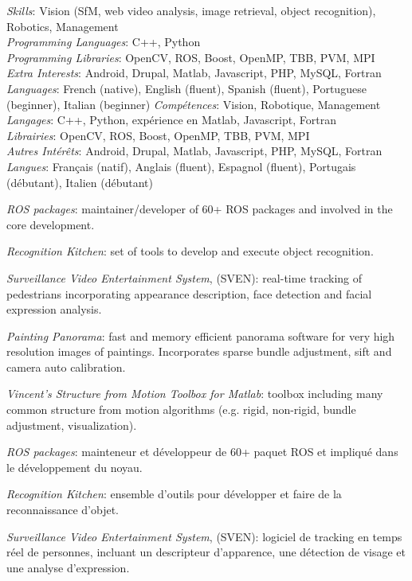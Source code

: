 \documentclass{article}
\begin{document}
\begin{llist}
{
{\em Skills}: Vision (SfM, web video analysis, image retrieval, object recognition), Robotics, Management \\
{\em Programming Languages}: C++, Python\\
{\em Programming Libraries}: OpenCV, ROS, Boost, OpenMP, TBB, PVM, MPI \\
{\em Extra Interests}: Android, Drupal, Matlab, Javascript, PHP, MySQL, Fortran \\
{\em Languages}: French (native), English (fluent), Spanish (fluent), Portuguese (beginner), Italian (beginner)
}
{
{\em Comp\'{e}tences}: Vision, Robotique, Management\\
{\em Langages}: C++, Python, exp\'{e}rience en Matlab, Javascript, Fortran \\
{\em Librairies}: OpenCV, ROS, Boost, OpenMP, TBB, PVM, MPI \\
{\em Autres Int\'{e}r\^{e}ts}: Android, Drupal, Matlab, Javascript, PHP, MySQL, Fortran \\
{\em Langues}: Fran\c{c}ais (natif), Anglais (fluent), Espagnol (fluent), Portugais (d\'{e}butant), Italien 
(d\'{e}butant)
}

{
{\em ROS packages}: maintainer/developer of 60+ ROS packages and involved in the core development.

{\em Recognition Kitchen}: set of tools to develop and execute object recognition.

{\em Surveillance Video Entertainment System}, (SVEN): real-time tracking of pedestrians incorporating appearance 
description, face detection and facial expression analysis.

{\em Painting Panorama}: fast and memory efficient panorama software for very high resolution images of paintings.  Incorporates sparse bundle adjustment, sift and camera auto calibration.

{\em Vincent's Structure from Motion Toolbox for Matlab}: toolbox including many common structure from motion algorithms 
(e.g. rigid, non-rigid, bundle adjustment, visualization).
}
{
{\em ROS packages}: mainteneur et d\'{e}veloppeur de 60+ paquet ROS et impliqu\'{e} dans le d\'{e}veloppement du 
noyau.

{\em Recognition Kitchen}: ensemble d'outils pour d\'{e}velopper et faire de la reconnaissance d'objet.

{\em Surveillance Video Entertainment System}, (SVEN): logiciel de tracking en temps r\'eel de personnes, incluant un 
descripteur d'apparence, une d\'{e}tection de visage et une analyse d'expression.

}
\end{llist}
\end{document}
